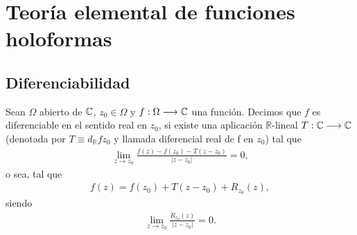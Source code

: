 \chapter{Teoría elemental de funciones holoformas}

\section{Diferenciabilidad}

\begin{defi}
    Sean $\Omega$ abierto de $\mathbb{C}$, $z_0 \in \Omega$ y $f: \Omega \longrightarrow \mathbb{C}$ una función. Decimos que $f$ es diferenciable en el sentido real en $z_0$, si existe una aplicación $\mathbb{R}$-lineal $T : \mathbb{C} \longrightarrow \mathbb{C}$ (denotada por $T \equiv d_{\mathbb{R}}fz_0$ y llamada diferencial real de f en $z_0$) tal que
    \begin{align*}
        \lim_{z \to z_0}{\frac{f(z) - f(z_0) - T(z-z_0)}{|z-z_0|} = 0},
    \end{align*}
    o sea, tal que
    \begin{align*}
        f(z) = f(z_0) + T(z-z_0) + R_{z_0}(z),
    \end{align*}
    siendo
    \begin{align*}
        \lim_{z \to z_0}{\frac{R_{z_0}(z)}{|z-z_0|} = 0}.
    \end{align*}
\end{defi}

